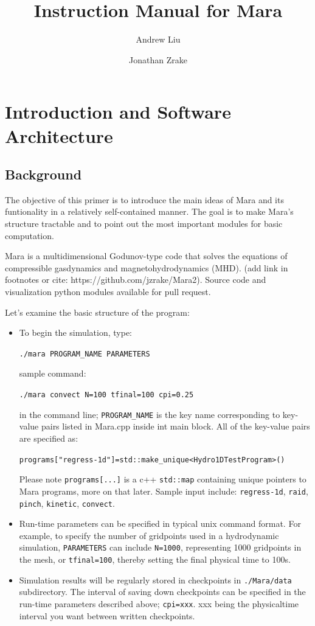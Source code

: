 \documentclass{article}
\title{Instruction Manual for Mara}
\author{Andrew Liu \and Jonathan Zrake}
\begin{document}
\maketitle

\section{Introduction and Software Architecture}
\subsection{Background}
The objective of this primer is to introduce the main ideas of Mara and its funtionality in a relatively self-contained manner. The goal is to make Mara's structure tractable and to point out the most important modules for basic computation.

Mara is a multidimensional Godunov-type code that solves the equations of
compressible gasdynamics and magnetohydrodynamics (MHD). (add link in footnotes or cite: https://github.com/jzrake/Mara2). Source code and visualization python modules available for pull request.

Let's examine the basic structure of the program:
\begin{itemize}
	\item To begin the simulation, type: 

	\texttt{./mara PROGRAM\_NAME PARAMETERS}

	sample command:

\texttt{./mara convect N=100 tfinal=100 cpi=0.25}
	
in the command line; \texttt{PROGRAM\_NAME} is the key name corresponding to key-value pairs listed in Mara.cpp inside int main block. All of the key-value pairs are specified as: 

\texttt{programs["regress-1d"]=std::make\_unique<Hydro1DTestProgram>()}

Please note \texttt{programs[...]} is a c++ \texttt{std::map} containing unique pointers to Mara programs, more on that later. Sample input include: \texttt{regress-1d}, \texttt{raid}, \texttt{pinch}, \texttt{kinetic}, \texttt{convect}.

	\item Run-time parameters can be specified in typical unix command format. For example, to specify the number of gridpoints used in a hydrodynamic simulation, \texttt{PARAMETERS} can include \texttt{N=1000}, representing 1000 gridpoints in the mesh, or \texttt{tfinal=100}, thereby setting the final physical time to 100s.  
	
	\item Simulation results will be regularly stored in checkpoints in \texttt{./Mara/data} subdirectory. The interval of saving down checkpoints can be specified in the run-time parameters described above; \texttt{cpi=xxx}. xxx being the physicaltime interval you want between written checkpoints.
	

\end{itemize}
\end{document}
